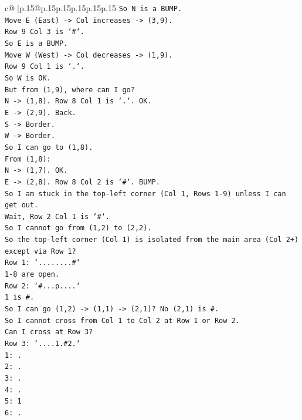 \documentclass{article}
\begin{document}
{\begin{supertabular}{c@{$\;$}|p{.15\linewidth}@{}p{.15\linewidth}p{.15\linewidth}p{.15\linewidth}p{.15\linewidth}p{.15\linewidth}}
{{{\texttt{So N is a BUMP.} \\
\texttt{Move E (East) {-}> Col increases {-}> (3,9).} \\
\texttt{Row 9 Col 3 is `\#`.} \\
\texttt{So E is a BUMP.} \\
\texttt{Move W (West) {-}> Col decreases {-}> (1,9).} \\
\texttt{Row 9 Col 1 is `.`.} \\
\texttt{So W is OK.} \\
\texttt{But from (1,9), where can I go?} \\
\texttt{N {-}> (1,8). Row 8 Col 1 is `.`. OK.} \\
\texttt{E {-}> (2,9). Back.} \\
\texttt{S {-}> Border.} \\
\texttt{W {-}> Border.} \\
\texttt{So I can go to (1,8).} \\
\texttt{From (1,8):} \\
\texttt{N {-}> (1,7). OK.} \\
\texttt{E {-}> (2,8). Row 8 Col 2 is `\#`. BUMP.} \\
\texttt{So I am stuck in the top{-}left corner (Col 1, Rows 1{-}9) unless I can get out.} \\
\texttt{Wait, Row 2 Col 1 is `\#`.} \\
\texttt{So I cannot go from (1,2) to (2,2).} \\
\texttt{So the top{-}left corner (Col 1) is isolated from the main area (Col 2+) except via Row 1?} \\
\texttt{Row 1: `........\#`} \\
\texttt{1{-}8 are open.} \\
\texttt{Row 2: `\#...p....`} \\
\texttt{1 is \#.} \\
\texttt{So I can go (1,2) {-}> (1,1) {-}> (2,1)? No (2,1) is \#.} \\
\texttt{So I cannot cross from Col 1 to Col 2 at Row 1 or Row 2.} \\
\texttt{Can I cross at Row 3?} \\
\texttt{Row 3: `....1.\#2.`} \\
\texttt{1: .} \\
\texttt{2: .} \\
\texttt{3: .} \\
\texttt{4: .} \\
\texttt{5: 1} \\
\texttt{6: .} \\
}}}
\end{supertabular}}
\end{document}
